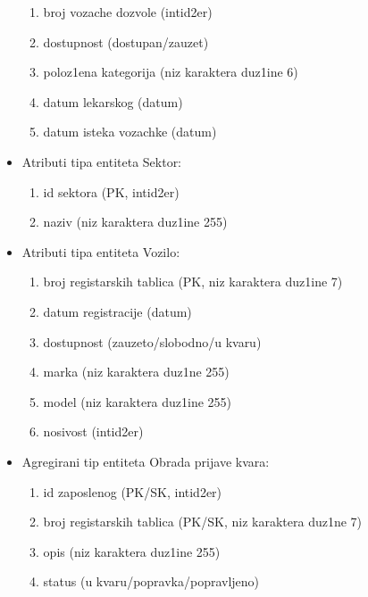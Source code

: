 \begin{itemize}
\begin{enumerate}
    \item{broj vozache dozvole (intid2er)}
    \item{dostupnost (dostupan/zauzet)}
    \item{poloz1ena kategorija (niz karaktera duz1ine 6)}
    \item{datum lekarskog (datum)}
    \item{datum isteka vozachke (datum)}
\end{enumerate}
\item
Atributi tipa entiteta Sektor:
\begin{enumerate}
    \item {id sektora (PK, intid2er)}
    \item{naziv (niz karaktera duz1ine 255)}
\end{enumerate}
\item
Atributi tipa entiteta Vozilo:
\begin{enumerate}
    \item {broj registarskih tablica (PK, niz karaktera duz1ine 7)}
    \item{datum registracije (datum)}
    \item{dostupnost (zauzeto/slobodno/u kvaru)}
    \item{marka (niz karaktera duz1ne 255)}
    \item{model (niz karaktera duz1ine 255)}
    \item{nosivost (intid2er)}
\end{enumerate}
\item
Agregirani tip entiteta Obrada prijave kvara:
\begin{enumerate}
    \item {id zaposlenog (PK/SK, intid2er)}
    \item{broj registarskih tablica (PK/SK, niz karaktera duz1ne 7)}
    \item{opis (niz karaktera duz1ine 255)}
    \item{status (u kvaru/popravka/popravljeno)}
\end{enumerate}


\end{itemize}
